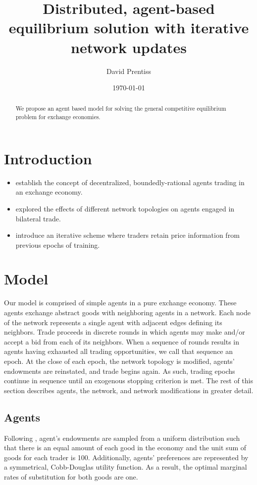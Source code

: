 \documentclass[smallextended]{svjour3}
\begin{document}
\title{Distributed, agent-based equilibrium solution with iterative network
updates}
\author{David Prentiss}
\date{\today}
\maketitle
\begin{abstract}
  We propose an agent based model for solving the general competitive
  equilibrium problem for exchange economies.
\end{abstract}
\section{Introduction}
\begin{itemize}
\item \cite{albin1992decentralized} establish the concept of decentralized,
  boundedly-rational agents trading in an exchange economy.
\item \cite{wilhite2001bilateral} explored the effects of different network
  topologies on agents engaged in bilateral trade.
\item \cite{sunder2002simple} introduce an iterative scheme where traders retain
  price information from previous epochs of training.
\end{itemize}
\section{Model}
Our model is comprised of simple agents in a pure exchange economy.
These agents exchange abstract goods with neighboring agents in a network.
Each node of the network represents a single agent with adjacent edges defining
its neighbors.
Trade proceeds in discrete rounds in which agents may make and/or accept a bid
from each of its neighbors.
When a sequence of rounds results in agents having exhausted all trading
opportunities, we call that sequence an epoch.
At the close of each epoch, the network topology is modified, agents'
endowments are reinstated, and trade begins again.
As such, trading epochs continue in sequence until an exogenous stopping
criterion is met.
The rest of this section describes agents, the network, and network
modifications in greater detail.

\subsection{Agents}
Following \cite{albin1992decentralized}, agent's endowments are sampled from a uniform distribution such that there is an equal amount of each good in the economy and the unit sum of goods for each trader is 100.
Additionally, agents' preferences are represented by a symmetrical, Cobb-Douglas utility function.
As a result, the optimal marginal rates of substitution for both goods are one.
\end{document}

